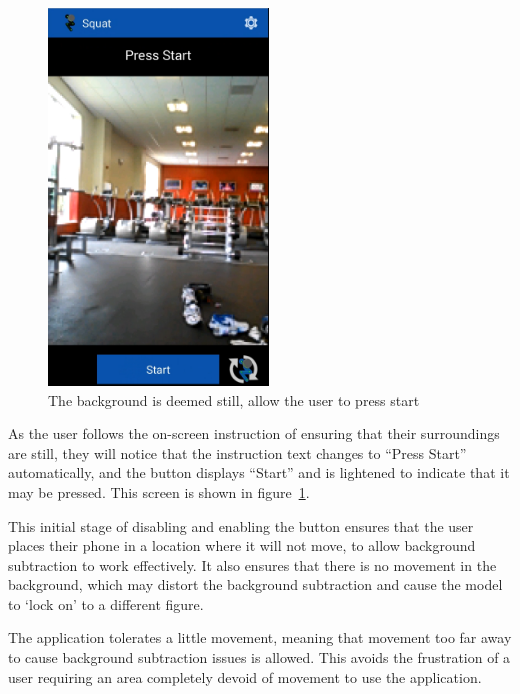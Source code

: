 \begin{figure}[H]
    \centering
	\includegraphics[height=10cm]{application/images/pressstart}
\caption{The background is deemed still, allow the user to press start}
\label{fig:pressstart}
\end{figure}

As the user follows the on-screen instruction of ensuring that their surroundings are still, they will notice that the instruction text changes to ``Press Start'' automatically, and the button displays ``Start'' and is lightened to indicate that it may be pressed. This screen is shown in figure~\ref{fig:pressstart}.

This initial stage of disabling and enabling the button ensures that the user places their phone in a location where it will not move, to allow background subtraction to work effectively. It also ensures that there is no movement in the background, which may distort the background subtraction and cause the model to `lock on' to a different figure.

The application tolerates a little movement, meaning that movement too far away to cause background subtraction issues is allowed. This avoids the frustration of a user requiring an area completely devoid of movement to use the application.

